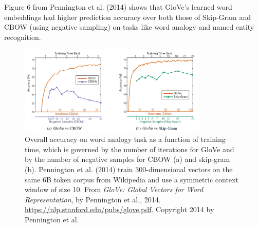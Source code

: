 Figure 6 from Pennington et al. (2014) shows that GloVe's learned word embeddings had higher prediction accuracy over both those of Skip-Gram and CBOW (using negative sampling) on tasks like word analogy and named entity recognition. 

\begin{figure}[h]
\centering
\includegraphics[width=0.8\textwidth]{imgs/table_gloveVSword2vec.png}
\caption{Overall accuracy on word analogy task as a function of training time, which is governed by the number of iterations for GloVe and by the number of negative samples for CBOW (a) and skip-gram (b). Pennington et al. (2014) train 300-dimensional vectors on the same 6B token corpus from Wikipedia and use a symmetric context window of size 10. From \emph{GloVe: Global Vectors for Word Representation}, by Pennington et al., 2014. \url{https://nlp.stanford.edu/pubs/glove.pdf}. Copyright 2014 by Pennington et al.}
\end{figure}
